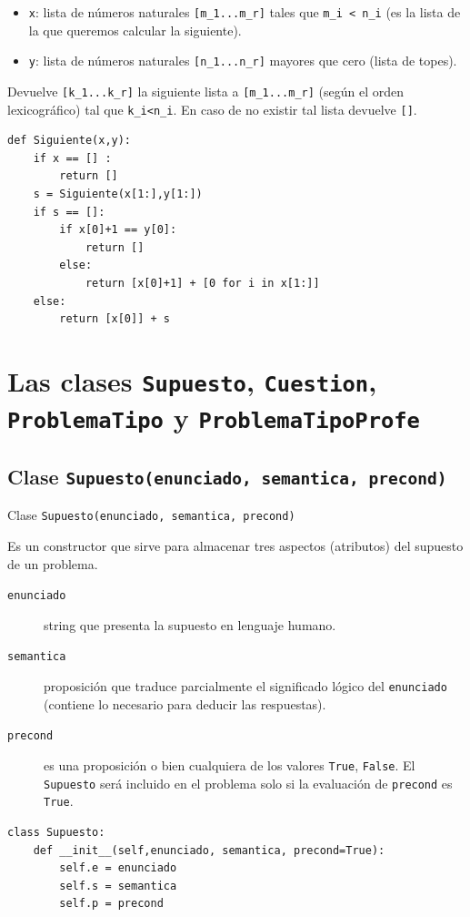 \documentclass[10pt,a4paper]{report}
\begin{document}
\begin{itemize}
\item \texttt{x}: lista de números naturales \texttt{[m\_1...m\_r]} tales   que \texttt{m\_i < n\_i} (es la lista de la que queremos calcular la siguiente).
\item \texttt{y}: lista de números naturales \texttt{[n\_1...n\_r]} mayores que cero (lista de topes).
\end{itemize}
Devuelve \texttt{[k\_1...k\_r]} la siguiente lista a \texttt{[m\_1...m\_r]} (según el orden lexicográfico) tal que \texttt{k\_i<n\_i}. 
En caso de no existir tal lista devuelve \texttt{[]}.
\begin{verbatim}
def Siguiente(x,y):
    if x == [] :
        return []    
    s = Siguiente(x[1:],y[1:])
    if s == []:
        if x[0]+1 == y[0]:
            return []
        else:
            return [x[0]+1] + [0 for i in x[1:]]
    else:
        return [x[0]] + s
\end{verbatim}
\chapter{Las clases \texttt{Supuesto}, \texttt{Cuestion}, \texttt{ProblemaTipo} y \texttt{ProblemaTipoProfe}}
\label{sec:orgcf27e84}

\section{Clase \texttt{Supuesto(enunciado, semantica, precond)}}
\label{sec:org9d3143c}

Clase \texttt{Supuesto(enunciado, semantica, precond)}

Es un constructor que sirve para almacenar tres aspectos (atributos) del supuesto de un problema.

\begin{description}
\item[{\texttt{enunciado}}] string que presenta la supuesto en lenguaje humano.

\item[{\texttt{semantica}}] proposición que traduce parcialmente el significado lógico del \texttt{enunciado} (contiene lo necesario para deducir las respuestas).

\item[{\texttt{precond}}] es una proposición o bien cualquiera de los valores  \texttt{True}, \texttt{False}. 
El \texttt{Supuesto} será incluido en el problema solo si la evaluación de \texttt{precond} es \texttt{True}.
\end{description}
\begin{verbatim}
class Supuesto:
    def __init__(self,enunciado, semantica, precond=True):
        self.e = enunciado
        self.s = semantica
        self.p = precond
\end{verbatim}
\end{document}
